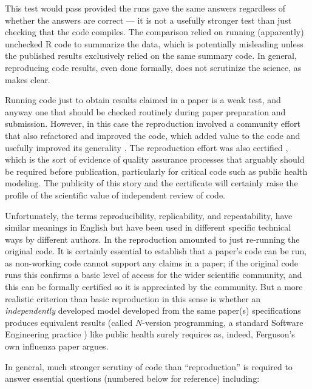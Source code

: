\documentclass{comjnl}
\begin{document}
This test would pass provided the runs gave the same answers regardless of whether the answers are correct --- it is not a usefully stronger test than just checking that the code compiles. The comparison relied on running (apparently) unchecked R code to summarize the data, which is potentially misleading unless the published results \cite{ICmodel} exclusively relied on the same summary code. In general, reproducing code results, even done formally, does not scrutinize the science, as  \cite{codecheck-certificate} makes clear.

Running code just to obtain results claimed in a paper is a weak test, and anyway one that should be checked routinely during paper preparation and submission. However, in this case the reproduction involved a community effort that also refactored and improved the code, which added value to the code and usefully improved its generality \cite{codecheck}. The reproduction effort was also certified \cite{codecheck-certificate}, which is the sort of evidence of quality assurance processes that arguably should be required before publication, particularly for critical code such as public health modeling. The publicity of this story and the certificate will certainly raise the profile of the scientific value of independent review of code. 

Unfortunately, the terms reproducibility, replicability, and repeatability, have similar meanings in English but have been used in different specific technical ways by different authors. In \cite{codecheck,thumbs-up} the reproduction amounted to just re-running the original code. It is certainly essential to establish that a paper's code can be run, as non-working code cannot support any claims in a paper; if the original code runs this confirms a basic level of access for the wider scientific community, and this can be formally certified \cite{codecheck-certificate} so it is appreciated by the community. But a more realistic criterion than basic reproduction in this sense is whether an \emph{independently\/} developed model developed from the same paper(s) specifications produces equivalent results (called $N$-version programming, a standard Software Engineering practice \cite{NVP}) like public health surely requires as, indeed, Ferguson's own influenza paper \cite{nvp-ferguson} argues. 

In general, much stronger scrutiny of code than ``reproduction'' is required to answer essential questions (numbered below for reference) including:
\end{document}
